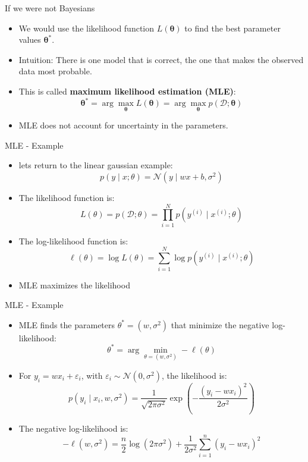\documentclass{beamer}
\begin{document}
\begin{frame}{If we were not Bayesians}
  \begin{itemize}
  \item We would use the likelihood function $L(\bm{\theta})$ to find the best parameter values $\bm{\theta}^*$.
    \item Intuition: There is one model that is correct, the one that makes the observed data most probable.
    \item This is called \textbf{maximum likelihood estimation (MLE)}:
      \[
        \bm{\theta}^* = \arg\max_{\bm{\theta}} L(\bm{\theta}) = \arg\max_{\bm{\theta}} p(\mathcal{D}; \bm{\theta})
      \]
    \item MLE does not account for uncertainty in the parameters.
\end{itemize}
  \end{frame}


  \begin{frame}{MLE - Example}
    \begin{itemize}
    \item lets return to the linear gaussian example: \[p(y \mid x; \theta) = \mathcal{N}(y \mid w x + b, \sigma^2)\]
    \item The likelihood function is:
     \[ L(\theta) = p(\mathcal{D}; \theta) = \prod_{i=1}^N p(y^{(i)} \mid x^{(i)}; \theta) \]
   \item The log-likelihood function is:
     \[
       \ell(\theta) = \log L(\theta) = \sum_{i=1}^N \log p(y^{(i)} \mid x^{(i)}; \theta)
     \]
    \item MLE maximizes the likelihood

    \end{itemize}
  \end{frame}

\begin{frame}{MLE - Example}
  \begin{itemize}
    \item MLE finds the parameters $\theta^* = (w, \sigma^2)$ that minimize the negative log-likelihood:
    \[
      \theta^* = \arg\min_{\theta = (w, \sigma^2)} -\ell(\theta)
    \]

    \item For $y_i = wx_i + \varepsilon_i$, with $\varepsilon_i \sim \mathcal{N}(0, \sigma^2)$, the likelihood is:
    \[
      p(y_i \mid x_i, w, \sigma^2) = \frac{1}{\sqrt{2\pi\sigma^2}} \exp\left(-\frac{(y_i - w x_i)^2}{2\sigma^2}\right)
    \]

    \item The negative log-likelihood is:
    \[
      -\ell(w, \sigma^2) = \frac{n}{2} \log(2\pi \sigma^2) + \frac{1}{2\sigma^2} \sum_{i=1}^n (y_i - w x_i)^2
    \]

  \end{itemize}
\end{frame}
\end{document}
